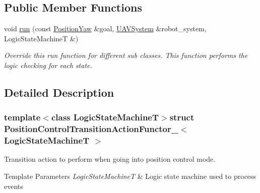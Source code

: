 \subsection*{Public Member Functions}
\begin{DoxyCompactItemize}
\item 
void \hyperlink{structPositionControlTransitionActionFunctor___a4970bb461809ffa30984e16902bb8aaa}{run} (const \hyperlink{structPositionYaw}{Position\-Yaw} \&goal, \hyperlink{classUAVSystem}{U\-A\-V\-System} \&robot\-\_\-system, Logic\-State\-Machine\-T \&)
\begin{DoxyCompactList}\small\item\em Override this run function for different sub classes. This function performs the logic checking for each state. \end{DoxyCompactList}\end{DoxyCompactItemize}


\subsection{Detailed Description}
\subsubsection*{template$<$class Logic\-State\-Machine\-T$>$struct Position\-Control\-Transition\-Action\-Functor\-\_\-$<$ Logic\-State\-Machine\-T $>$}

Transition action to perform when going into position control mode. 


\begin{DoxyTemplParams}{Template Parameters}
{\em Logic\-State\-Machine\-T} & Logic state machine used to process events \\
\hline
\end{DoxyTemplParams}


